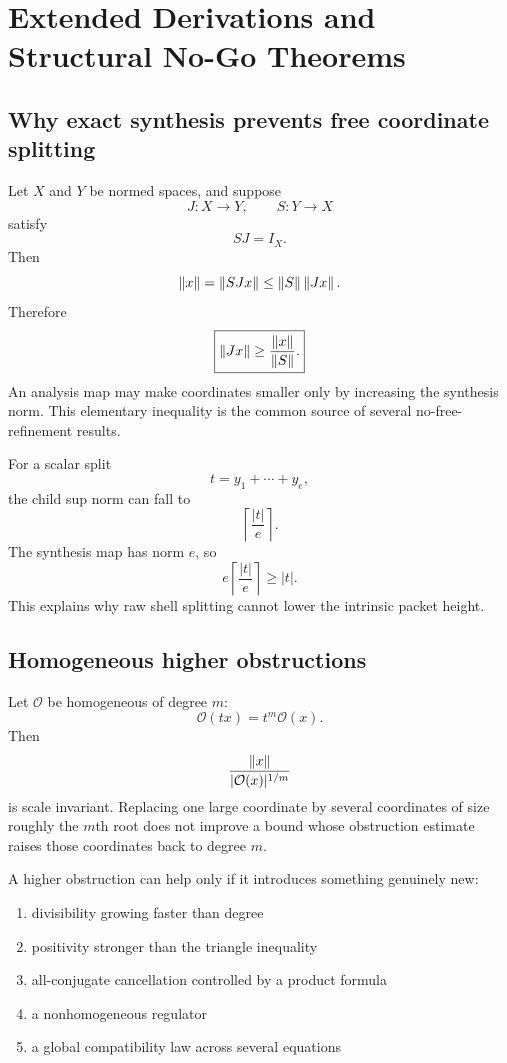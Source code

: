 \chapter{Extended Derivations and Structural No-Go Theorems}

\section{Why exact synthesis prevents free coordinate splitting}
Let $X$ and $Y$ be normed spaces, and suppose
\[
 J:X\longrightarrow Y,
 \qquad
 S:Y\longrightarrow X
\]
satisfy
\[
 SJ=I_X.
\]
Then
\[
 \left\lVert x\right\rVert
 =
 \left\lVert SJx\right\rVert
 \le
 \left\lVert S\right\rVert\left\lVert Jx\right\rVert.
\]
Therefore
\[
 \boxed{
 \left\lVert Jx\right\rVert
 \ge
 \frac{\left\lVert x\right\rVert}{\left\lVert S\right\rVert}.
 }
\]
An analysis map may make coordinates smaller only by increasing the synthesis norm. This elementary inequality is the common source of several no-free-refinement results.

For a scalar split
\[
 t=y_1+\cdots+y_e,
\]
the child sup norm can fall to
\[
 \left\lceil\frac{|t|}{e}\right\rceil.
\]
The synthesis map has norm $e$, so
\[
 e\left\lceil\frac{|t|}{e}\right\rceil\ge|t|.
\]
This explains why raw shell splitting cannot lower the intrinsic packet height.

\section{Homogeneous higher obstructions}
Let $\mathcal O$ be homogeneous of degree $m$:
\[
 \mathcal O(tx)=t^m\mathcal O(x).
\]
Then
\[
 \frac{\left\lVert x\right\rVert}
 {|\mathcal O(x)|^{1/m}}
\]
is scale invariant. Replacing one large coordinate by several coordinates of size roughly the $m$th root does not improve a bound whose obstruction estimate raises those coordinates back to degree $m$.

A higher obstruction can help only if it introduces something genuinely new:

\begin{enumerate}[leftmargin=1.5em]
\item divisibility growing faster than degree
\item positivity stronger than the triangle inequality
\item all-conjugate cancellation controlled by a product formula
\item a nonhomogeneous regulator
\item a global compatibility law across several equations
\end{enumerate}

